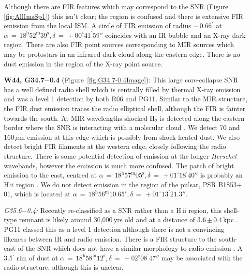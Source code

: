 \documentclass[fleqn,usenatbib]{mnras}
\begin{document}
{Although there are FIR features which may correspond to the SNR (Figure\,\ref{fig:AllImsSp1}) this isn't clear; the region is confused and there is extensive FIR emission from the local ISM.
A circle of FIR emission of radius $\sim$\,0.66$^\prime$ at $\alpha\,=\,18^\text{h}52^\text{m}39^\text{s}, \delta\,=\,+00^\circ41^\prime59''$ coincides with an IR bubble \citep{Simpson2012} and an X-ray dark region. There are also FIR point sources corresponding to MIR sources which may be protostars \citep{Reach2006} in an infrared dark cloud along the eastern edge. There is no dust emission in the region of the X-ray point source.
\bigskip

\textbf{W44, G34.7$-$0.4} (Figure~\ref{fig:G34.7-0.4Image}): This large core-collapse SNR has a well defined radio shell which is centrally filled by thermal X-ray emission \citep{Jones1993, Rho1994} and was a level 1 detection by both R06 and PG11. Similar to the MIR structure, the FIR dust emission traces the radio elliptical shell, although the FIR is fainter towards the south.
At MIR wavelengths shocked H$_2$ is detected along the eastern border \citep{Reach2005a} where the SNR is interacting with a molecular cloud \citep{Giacani1997, Yusef-Zadeh2003, Reach2006}. We detect 70 and 160\,$\mu$m emission at this edge which is possibly from shock-heated dust.
We also detect bright FIR filaments at the western edge, closely following the radio structure.
There is some potential detection of emission at the longer \textit{Herschel} wavebands, however the emission is much more confused. The patch of bright emission to the east, centred at $\alpha\,=\,18^\text{h}57^\text{m}05^\text{s}, \delta\,=\,+01^\circ18^\prime40''$ is probably an H\,{\sc ii} region \citep{Rho1994}. We do not detect emission in the region of the pulsar, PSR B1853$+$01, which is located at $\alpha\,=\,18^\text{h}56^\text{m}10.65^\text{s}, \delta\,=\,+01^\circ13^\prime21.3''$.
\bigskip

\textit{G35.6$-$0.4:} Recently re-classified as a SNR rather than a H\,{\sc ii} region, this shell-type remnant is likely around 30,000\,yrs old and at a distance of 3.6\,$\pm$\,0.4\,kpc \citep{Green2009, Zhu2013}. PG11 classed this as a level 1 detection although there is not a convincing likeness between IR and radio emission.
There is a FIR structure to the south-east of the SNR which does not have a similar morphology to radio emission \citep{Zhu2013}. A 3.5$^\prime$ rim of dust at $\alpha\,=\,18^\text{h}58^\text{m}12^\text{s}, \delta\,=\,+02^\circ08^\prime47''$ may be associated with the radio structure, although this is unclear.

}
\end{document}
